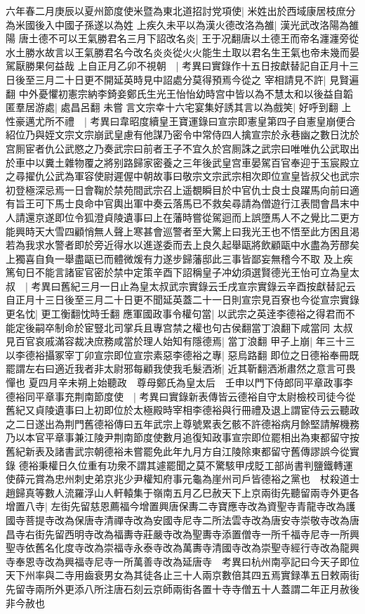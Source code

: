 六年春二月庚辰以夏州節度使米暨為東北道招討党項使|{
	米姓出於西域康居枝庶分為米國後入中國子孫遂以為姓}
上疾久未平以為漢火德改洛為雒|{
	漢光武改洛陽為雒陽}
唐土德不可以王氣勝君名三月下詔改名炎|{
	王于况翻唐以土德王而帝名瀍瀍旁從水土勝水故言以王氣勝君名今改名炎炎從火火能生土取以君名生王氣也帝未幾而晏駕厭勝果何益哉}
上自正月乙卯不視朝　|{
	考異曰實錄作十五日按獻替記自正月十三日後至三月二十日更不開延英時見中詔處分莫得預焉今從之}
宰相請見不許|{
	見賢遍翻}
中外憂懼初憲宗納李錡妾鄭氏生光王怡怡幼時宫中皆以為不慧太和以後益自韜匿羣居游處|{
	處昌呂翻}
未嘗言文宗幸十六宅宴集好誘其言以為戲笑|{
	好呼到翻}
上性豪邁尤所不禮　|{
	考異曰韋昭度續皇王寶運錄曰宣宗即憲皇第四子自憲皇崩便合紹位乃與姪文宗文宗崩武皇慮有他謀乃密令中常侍四人擒宣宗於永巷幽之數日沈於宫厠宦者仇公武愍之乃奏武宗曰前者王子不宜久於宫厠誅之武宗曰唯唯仇公武取出於車中以糞土雜物覆之將别路歸家密養之三年後武皇宫車晏駕百官奉迎于玉宸殿立之尋擢仇公武為軍容使尉遲偓中朝故事曰敬宗文宗武宗相次即位宣皇皆叔父也武宗初登極深忌焉一日會鞠於禁苑間武宗召上遥覩瞬目於中官仇士良士良躍馬向前曰適有旨王可下馬士良命中官輿出軍中奏云落馬已不救矣尋請為僧遊行江表間會昌末中人請還京遂即位令狐澄貞陵遺事曰上在藩時嘗從駕迴而上誤墮馬人不之覺比二更方能興時天大雪四顧悄無人聲上寒甚會巡警者至大驚上曰我光王也不悟至此方困且渇若為我求水警者即於旁近得水以進遂委而去上良久起舉甌將飲顧甌中水盡為芳醪矣上獨喜自負一舉盡甌已而體微煖有力遂步歸藩邸此三事皆鄙妄無稽今不取}
及上疾篤旬日不能言諸宦官密於禁中定策辛酉下詔稱皇子冲幼須選賢德光王怡可立為皇太叔　|{
	考異曰舊紀三月一日止為皇太叔武宗實錄云壬戌宣宗實錄云辛酉按獻替記云自正月十三日後至三月二十日更不聞延英蓋二十一日則宣宗見百寮也今從宣宗實錄}
更名忱|{
	更工衡翻忱時壬翻}
應軍國政事令權句當|{
	以武宗之英逹李德裕之得君而不能定後嗣卒制命於宦豎北司掌兵且專宫禁之權也句古侯翻當丁浪翻下咸當同}
太叔見百官哀戚滿容裁决庶務咸當於理人始知有隱德焉|{
	當丁浪翻}
甲子上崩|{
	年三十三}
以李德裕攝冢宰丁卯宣宗即位宣宗素惡李德裕之專|{
	惡烏路翻}
即位之日德裕奉冊既罷謂左右曰適近我者非太尉邪每顧我使我毛髮洒淅|{
	近其靳翻洒淅肅然之意言可畏憚也}
夏四月辛未朔上始聽政　尊母鄭氏為皇太后　壬申以門下侍郎同平章政事李德裕同平章事充荆南節度使　|{
	考異曰實錄新表傳皆云德裕自守太尉檢校司徒今從舊紀又貞陵遺事曰上初即位於太極殿時宰相李德裕與行冊禮及退上謂宦侍云云聽政之二日遂出為荆門舊德裕傳曰五年武宗上尊號累表乞骸不許德裕病月餘堅請解機務乃以本官平章事兼江陵尹荆南節度使數月追復知政事宣宗即位罷相出為東都留守按舊紀新表及諸書武宗朝德裕未嘗罷免此年九月方自江陵除東都留守舊傳謬誤今從實錄}
德裕秉權日久位重有功衆不謂其遽罷聞之莫不驚駭甲戌貶工部尚書判鹽鐵轉運使薛元賞為忠州刺史弟京兆少尹權知府事元龜為崖州司戶皆德裕之黨也　杖殺道士趙歸真等數人流羅浮山人軒轅集于嶺南五月乙巳赦天下上京兩街先聽留兩寺外更各增置八寺|{
	左街先留慈恩薦福今增置興唐保夀二寺寶應寺改為資聖寺青龍寺改為護國寺菩提寺改為保唐寺清禪寺改為安國寺尼寺二所法雲寺改為唐安寺崇敬寺改為唐昌寺右街先留西明寺改為福夀寺莊嚴寺改為聖夀寺添置僧寺一所千福寺尼寺一所興聖寺依舊名化度寺改為崇福寺永泰寺改為萬夀寺清國寺改為崇聖寺經行寺改為龍興寺奉恩寺改為興福寺尼寺一所萬善寺改為延唐寺　考異曰杭州南亭記曰今天子即位天下州率與二寺用齒衰男女為其徒各止三十人兩京數倍其四五焉實録凖五日敕兩街先留寺兩所外更添八所注唐石刻云京師兩街各置十寺寺僧五十人蓋謂二年正月赦後非今赦也}
